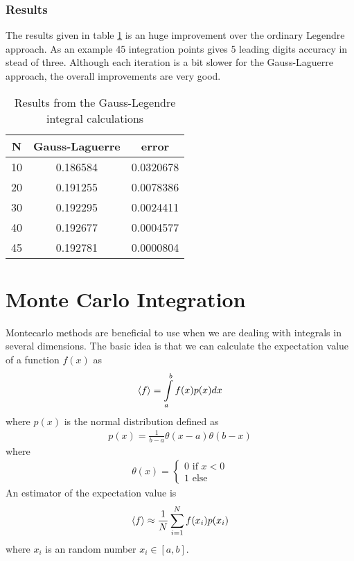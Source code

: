 \documentclass[11pt, a4paper]{article}
\begin{document}
\subsubsection*{Results}
The results given in table \ref{tab:glag} is an huge improvement over the ordinary Legendre approach. As an example 45 integration points gives 5 leading digits accuracy in stead of three. Although each iteration is a bit slower for the Gauss-Laguerre approach, the overall improvements are very good. 
\begin{table}[!ht]
\centering
\begin{tabular}{c|c|c}
N & Gauss-Laguerre & error\\
\hline
10 & 0.186584 & 0.0320678\\
20 & 0.191255 & 0.0078386\\
30 & 0.192295 & 0.0024411\\
40 & 0.192677 & 0.0004577\\
45 & 0.192781 & 0.0000804
\end{tabular}
\caption{Results from the Gauss-Legendre integral calculations}
\label{tab:glag}
\end{table}
\section{Monte Carlo Integration}
Montecarlo methods are beneficial to use when we are dealing with integrals in several dimensions. The basic idea is that we can calculate the expectation value of a function $f(x)$ as 
\begin{gather}
\braket{f} = \int\limits_a^b f(x)p(x)dx 
\end{gather} 
where $p(x)$ is the normal distribution defined as
\begin{gather}
p(x) = \frac{1}{b-a}\theta(x-a)\theta(b-x)
\end{gather}
where 
\begin{gather}
\theta(x) =
\begin{cases}
 0 \text{ if } x<0\\
 1 \text{ else}
\end{cases}
\end{gather}
An estimator of the expectation value is 
\begin{gather}
\braket{f} \approx \frac{1}{N}\sum\limits_{i=1}^Nf(x_i)p(x_i)
\end{gather}
where $x_i$ is an random number $x_i \in[a,b]$. 
\end{document}

